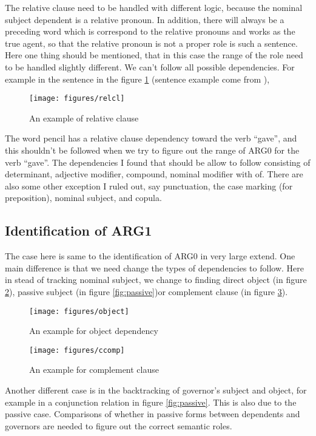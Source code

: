 \documentclass[letterpaper]{article}
\begin{document}
The relative clause need to be handled with different logic, because the nominal subject dependent is a relative pronoun. In addition, there will always be a preceding word which is correspond to the relative pronouns and works as the true agent, so that the relative pronoun is not a proper role is such a sentence. Here one thing should be mentioned, that in this case the range of the role need to be handled slightly different. We can't follow all possible dependencies. For example in the sentence in the figure \ref{fig:relcl} (sentence example come from \cite{relcl-example}),\\
\begin{figure}[H]
\centering
\texttt{[image: figures/relcl]}
\caption{An example of relative clause}
\label{fig:relcl}
\end{figure}
The word pencil has a relative clause dependency toward the verb ``gave'', and this shouldn't be followed when we try to figure out the range of ARG0 for the verb ``gave''. The dependencies I found that should be allow to follow consisting of determinant, adjective modifier, compound, nominal modifier with of. There are also some other exception I ruled out, say punctuation, the case marking (for preposition), nominal subject, and copula.

\subsection{Identification of ARG1}
The case here is same to the identification of ARG0 in very large extend. One main difference is that we need change the types of dependencies to follow. Here in stead of tracking nominal subject, we change to finding direct object (in figure \ref{fig:object}), passive subject (in figure \ref{fig:passive})or complement clause (in figure \ref{fig:ccomp}).
\begin{figure}[H]
\centering
\texttt{[image: figures/object]}
\caption{An example for object dependency}
\label{fig:object}
\end{figure}
\begin{figure}[H]
\centering
\texttt{[image: figures/ccomp]}
\caption{An example for complement clause}
\label{fig:ccomp}
\end{figure}

Another different case is in the backtracking of governor's subject and object, for example in a conjunction relation in figure \ref{fig:passive}. This is also due to the passive case. Comparisons of whether in passive forms between dependents and governors are needed to figure out the correct semantic roles. 
\end{document}
